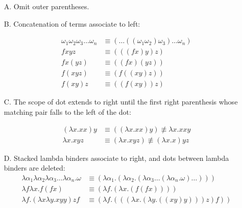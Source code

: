\documentclass[11pt]{article}
\begin{document}
\begin{itemize}

\item[A.] Omit outer parentheses.

\item[B.] Concatenation of terms associate to left:    

\begin{align*}
\omega_1\omega_2\omega_3\ldots\omega_n & \equiv (\ldots((\omega_1\omega_2)\omega_3)\ldots\omega_n)\\
fxyz & \equiv   (((fx)y)z)\\
fx(yz) & \equiv   ((fx)(yz))\\
f(xyz) & \equiv   (f((xy)z))\\
f(xy)z & \equiv   ((f(xy))z) 
\end{align*}

\item[C.] The scope of dot extends to right until the first right parenthesis whose matching pair falls to the left of the dot:

\begin{align*}
(\lambda x.xx)y & \equiv ((\lambda x.xx)y) \not\equiv \lambda x.xxy\\
\lambda x.xyz & \equiv (\lambda x.xyz) \not\equiv (\lambda x. x)yz
\end{align*}

\item[D.] Stacked lambda binders associate to right, and dots between lambda binders are deleted:
\begin{align*}
\lambda \alpha_1\lambda \alpha_2\lambda \alpha_3\ldots\lambda \alpha_n.\omega &\equiv (\lambda\alpha_1.(\lambda\alpha_2.(\lambda\alpha_3\ldots(\lambda\alpha_n.\omega)\ldots)))\\
\lambda f \lambda x.f(fx)  &\equiv  (\lambda f.(\lambda x.(f(fx))))\\
\lambda f.(\lambda x\lambda y.xyy)zf & \equiv (\lambda f.(((\lambda x.(\lambda y.((xy)y)))z)f))
\end{align*}

\end{itemize}
\end{document}

